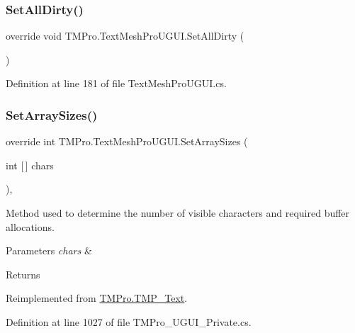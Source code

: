 \subsubsection{\texorpdfstring{SetAllDirty()}{SetAllDirty()}}
{\footnotesize\ttfamily override void T\+M\+Pro.\+Text\+Mesh\+Pro\+U\+G\+U\+I.\+Set\+All\+Dirty (\begin{DoxyParamCaption}{ }\end{DoxyParamCaption})}







Definition at line 181 of file Text\+Mesh\+Pro\+U\+G\+U\+I.\+cs.

\mbox{\label{class_t_m_pro_1_1_text_mesh_pro_u_g_u_i_aecb6caf598d9516490f37f0277326eb6}} 
\subsubsection{\texorpdfstring{SetArraySizes()}{SetArraySizes()}}
{\footnotesize\ttfamily override int T\+M\+Pro.\+Text\+Mesh\+Pro\+U\+G\+U\+I.\+Set\+Array\+Sizes (\begin{DoxyParamCaption}\item[{int \mbox{[}$\,$\mbox{]}}]{chars }\end{DoxyParamCaption})\hspace{0.3cm}{\ttfamily [protected]}, {\ttfamily [virtual]}}



Method used to determine the number of visible characters and required buffer allocations. 


\begin{DoxyParams}{Parameters}
{\em chars} & \\
\hline
\end{DoxyParams}
\begin{DoxyReturn}{Returns}

\end{DoxyReturn}


Reimplemented from \mbox{\hyperlink{class_t_m_pro_1_1_t_m_p___text_afb0b5462b35a2486f6e976c2a278702f}{T\+M\+Pro.\+T\+M\+P\+\_\+\+Text}}.



Definition at line 1027 of file T\+M\+Pro\+\_\+\+U\+G\+U\+I\+\_\+\+Private.\+cs.

